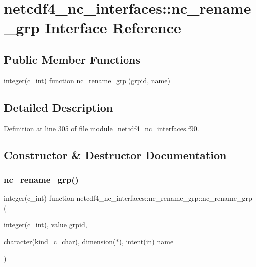 \hypertarget{interfacenetcdf4__nc__interfaces_1_1nc__rename__grp}{}\section{netcdf4\+\_\+nc\+\_\+interfaces\+:\+:nc\+\_\+rename\+\_\+grp Interface Reference}
\label{interfacenetcdf4__nc__interfaces_1_1nc__rename__grp}
\subsection*{Public Member Functions}
\begin{DoxyCompactItemize}
\item 
integer(c\+\_\+int) function \hyperlink{interfacenetcdf4__nc__interfaces_1_1nc__rename__grp_ad0a9c082b9f3d10e30f1b6efd5691a80}{nc\+\_\+rename\+\_\+grp} (grpid, name)
\end{DoxyCompactItemize}


\subsection{Detailed Description}


Definition at line 305 of file module\+\_\+netcdf4\+\_\+nc\+\_\+interfaces.\+f90.



\subsection{Constructor \& Destructor Documentation}
\mbox{\label{interfacenetcdf4__nc__interfaces_1_1nc__rename__grp_ad0a9c082b9f3d10e30f1b6efd5691a80}} 
\subsubsection{\texorpdfstring{nc\+\_\+rename\+\_\+grp()}{nc\_rename\_grp()}}
{\footnotesize\ttfamily integer(c\+\_\+int) function netcdf4\+\_\+nc\+\_\+interfaces\+::nc\+\_\+rename\+\_\+grp\+::nc\+\_\+rename\+\_\+grp (\begin{DoxyParamCaption}\item[{integer(c\+\_\+int), value}]{grpid,  }\item[{character(kind=c\+\_\+char), dimension($\ast$), intent(in)}]{name }\end{DoxyParamCaption})}



